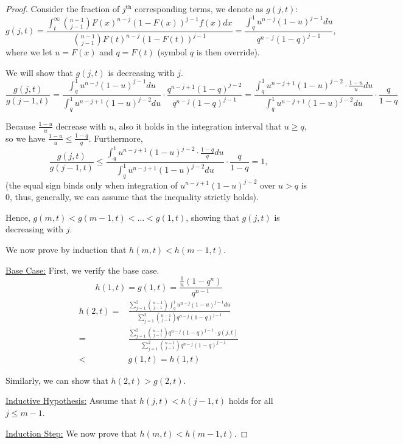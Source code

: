 \begin{proof}
    Consider the fraction of $j^\text{th}$ corresponding terms, we denote as $g(j,t)$:
    \[
    g(j,t)=\frac{\int_t^\infty \binom{n-1}{j-1} F(x)^{n-j} (1-F(x))^{j-1}f(x)dx}{\binom{n-1}{j-1} F(t)^{n-j} (1-F(t))^{j-1} }=\frac{\int_q^1 u^{n-j}(1-u)^{j-1}du}{q^{n-j}(1-q)^{j-1}},
    \]where we let $u=F(x)$ and $q=F(t)$ (symbol $q$ is then override).

    We will show that $g(j,t)$ is decreasing with $j$. 
    $$\frac{g(j,t)}{g(j-1,t)}=\frac{\int_q^1 u^{n-j}(1-u)^{j-1}du}{\int_q^1 u^{n-j+1}(1-u)^{j-2}du}\cdot \frac{q^{n-j+1}(1-q)^{j-2}}{q^{n-j}(1-q)^{j-1}}=\frac{\int_q^1 u^{n-j+1}(1-u)^{j-2}\cdot \frac{1-u}{u}du}{\int_q^1 u^{n-j+1}(1-u)^{j-2}du}\cdot\frac{q}{1-q}$$

    Because $\frac{1-u}{u}$ decrease with $u$, also it holds in the integration interval that $u\ge q$, so we have $\frac{1-u}{u}\le \frac{1-q}{q}$. Furthermore,
    $$\frac{g(j,t)}{g(j-1,t)}\le \frac{\int_q^1 u^{n-j+1}(1-u)^{j-2}\cdot \frac{1-q}{q}du}{\int_q^1 u^{n-j+1}(1-u)^{j-2}du}\cdot\frac{q}{1-q}=1,$$ (the equal sign binds only when integration of $u^{n-j+1}(1-u)^{j-2}$ over $u>q$ is $0$, thus, generally, we can assume that the inequality strictly holds). 

    Hence, $g(m,t)< g(m-1,t) < \ldots < g(1,t)$, showing that  $g(j,t)$ is decreasing with $j$. 

    We now prove by induction that $h(m,t)< h(m-1,t)$.

    \underline{Base Case:}
    First, we verify the base case. 
    $$h(1,t)=g(1,t)=\frac{\frac{1}{n}(1-q^n)}{q^{n-1}}$$
$$
\begin{aligned}
h(2,t)= & \frac{\sum_{j=1}^2 \binom{n-1}{j-1}\int_q^1 u^{n-j}(1-u)^{j-1}du}{\sum_{j=1}^2 \binom{n-1}{j-1} q^{n-j} (1-q)^{j-1} }\\
= &\frac{\sum_{j=1}^2 \binom{n-1}{j-1} q^{n-j} (1-q)^{j-1}\cdot g(j,t)}{\sum_{j=1}^2 \binom{n-1}{j-1} q^{n-j} (1-q)^{j-1} } \\ < & g(1,t) =h(1,t)
\end{aligned}
$$

Similarly, we can show that $h(2,t)>g(2,t)$.

    \underline{Inductive Hypothesis:}
    Assume that $h(j,t)< h(j-1,t)$ holds for all $j\leq m-1$.

    \underline{Induction Step:}
    We now prove that $h(m,t)< h(m-1,t)$. 


\end{proof}
